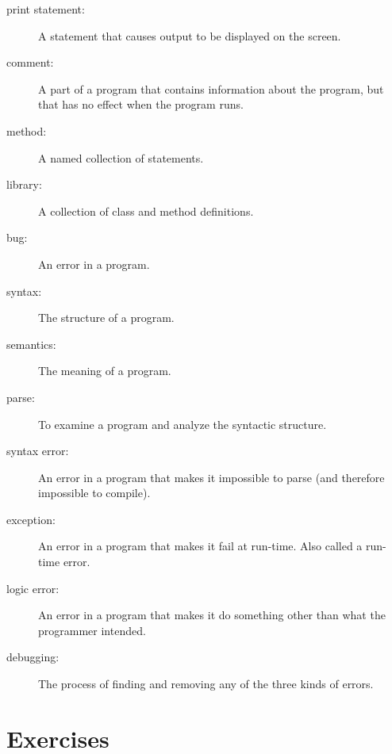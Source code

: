\documentclass[12pt]{book}
\theoremstyle{definition}
\begin{document}
\begin{description}
\item[print statement:] A statement that causes output to be displayed
  on the screen.

\item[comment:] A part of a program that contains information
about the program, but that has no effect when the program runs.

\item[method:] A named collection of statements.

\item[library:] A collection of class and method definitions.

\item[bug:]  An error in a program.

\item[syntax:]  The structure of a program.

\item[semantics:]  The meaning of a program.

\item[parse:]  To examine a program and analyze the syntactic structure.

\item[syntax error:]  An error in a program that makes it impossible
to parse (and therefore impossible to compile).

\item[exception:]  An error in a program that makes it fail at
run-time.  Also called a run-time error.

\item[logic error:]  An error in a program that makes it do something
other than what the programmer intended.

\item[debugging:]  The process of finding and removing any of
the three kinds of errors.


\end{description}

\section{Exercises}
\end{document}

